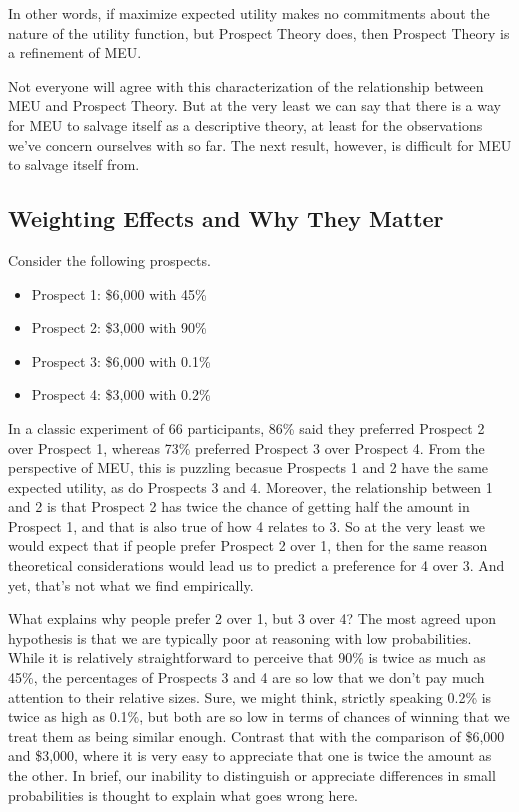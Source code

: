 \documentclass[]{tufte-book}
\begin{document}
In other words, if maximize expected utility makes no commitments about the nature of the utility function, but Prospect Theory does, then Prospect Theory is a refinement of MEU.

Not everyone will agree with this characterization of the relationship between MEU and Prospect Theory. But at the very least we can say that there is a way for MEU to salvage itself as a descriptive theory, at least for the observations we've concern ourselves with so far. The next result, however, is difficult for MEU to salvage itself from.

\hypertarget{weighting-effects-and-why-they-matter}{%
\subsection{Weighting Effects and Why They Matter}\label{weighting-effects-and-why-they-matter}}

Consider the following prospects.

\begin{itemize}
\item
  Prospect 1: \$6,000 with 45\%
\item
  Prospect 2: \$3,000 with 90\%
\item
  Prospect 3: \$6,000 with 0.1\%
\item
  Prospect 4: \$3,000 with 0.2\%
\end{itemize}

In a classic experiment of 66 participants, 86\% said they preferred Prospect 2 over Prospect 1, whereas 73\% preferred Prospect 3 over Prospect 4. From the perspective of MEU, this is puzzling becasue Prospects 1 and 2 have the same expected utility, as do Prospects 3 and 4. Moreover, the relationship between 1 and 2 is that Prospect 2 has twice the chance of getting half the amount in Prospect 1, and that is also true of how 4 relates to 3. So at the very least we would expect that if people prefer Prospect 2 over 1, then for the same reason theoretical considerations would lead us to predict a preference for 4 over 3. And yet, that's not what we find empirically.

What explains why people prefer 2 over 1, but 3 over 4? The most agreed upon hypothesis is that we are typically poor at reasoning with low probabilities. While it is relatively straightforward to perceive that 90\% is twice as much as 45\%, the percentages of Prospects 3 and 4 are so low that we don't pay much attention to their relative sizes. Sure, we might think, strictly speaking 0.2\% is twice as high as 0.1\%, but both are so low in terms of chances of winning that we treat them as being similar enough. Contrast that with the comparison of \$6,000 and \$3,000, where it is very easy to appreciate that one is twice the amount as the other. In brief, our inability to distinguish or appreciate differences in small probabilities is thought to explain what goes wrong here.
\end{document}
